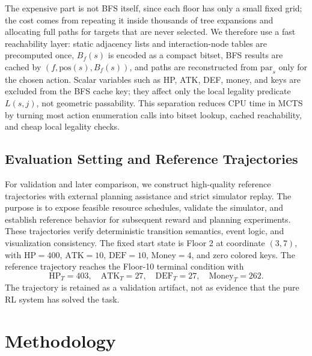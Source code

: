 \documentclass{article}
\begin{document}
The expensive part is not BFS itself, since each floor has only a small fixed
grid; the cost comes from repeating it inside thousands of tree expansions and
allocating full paths for targets that are never selected.  We therefore use a
fast reachability layer: static adjacency lists and interaction-node tables are
precomputed once, \(B_f(s)\) is encoded as a compact bitset, BFS results are
cached by \((f,\mathrm{pos}(s),B_f(s))\), and paths are reconstructed from
\(\mathrm{par}_s\) only for the chosen action.  Scalar variables such as HP,
ATK, DEF, money, and keys are excluded from the BFS cache key; they affect only
the local legality predicate \(L(s,j)\), not geometric passability.  This
separation reduces CPU time in MCTS by turning most action enumeration calls into
bitset lookup, cached reachability, and cheap local legality checks.

\subsection{Evaluation Setting and Reference Trajectories}
For validation and later comparison, we construct high-quality reference
trajectories with external planning assistance and strict simulator replay.  The
purpose is to expose feasible resource schedules, validate the simulator, and
establish reference behavior for subsequent reward and planning experiments.
These trajectories verify deterministic transition semantics, event logic,
and visualization consistency.  The fixed start
state is Floor 2 at coordinate \((3,7)\), with
\(\mathrm{HP}=400\), \(\mathrm{ATK}=10\), \(\mathrm{DEF}=10\),
\(\mathrm{Money}=4\), and zero colored keys.  The reference trajectory reaches the
Floor-10 terminal condition with
\[
  \mathrm{HP}_T=403,\quad
  \mathrm{ATK}_T=27,\quad
  \mathrm{DEF}_T=27,\quad
  \mathrm{Money}_T=262.
\]
The trajectory is retained as a validation artifact, not as evidence that the
pure RL system has solved the task.

\section{Methodology}
\end{document}
